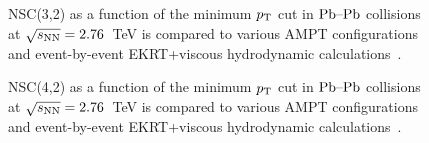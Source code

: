 \begin{figure}[p]
             \begin{center}
              \end{center}
             \caption{NSC(3,2) as a function of the minimum $p_{\rm T}$ cut in $\textnormal{Pb--Pb}$ collisions at $\sqrt{s_{\textnormal{NN}}}=2.76$~TeV is compared to various AMPT configurations and event-by-event EKRT+viscous hydrodynamic calculations~\cite{Niemi:2015qia}.}
             \label{fig:Figure_6}
\end{figure}

\begin{figure}[p]
             \begin{center}
              \end{center}
             \caption{NSC(4,2) as a function of the minimum $p_{\rm T}$ cut in $\textnormal{Pb--Pb}$ collisions at $\sqrt{s_{\textnormal{NN}}}=2.76$~TeV is compared to various AMPT configurations and event-by-event EKRT+viscous hydrodynamic calculations~\cite{Niemi:2015qia}.}
             \label{fig:Figure_7}
\end{figure}

